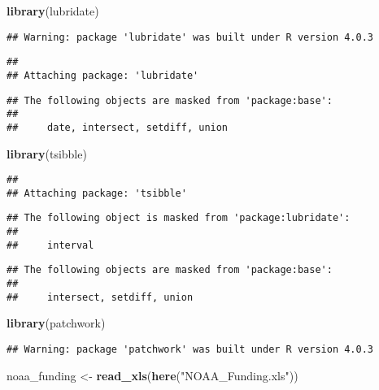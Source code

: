 \documentclass[
]{article}
\newenvironment{Shaded}{\begin{snugshade}}{\end{snugshade}}
\newcommand{\KeywordTok}[1]{\textcolor[rgb]{0.13,0.29,0.53}{\textbf{#1}}}
\newcommand{\NormalTok}[1]{#1}
\newcommand{\StringTok}[1]{\textcolor[rgb]{0.31,0.60,0.02}{#1}}
\begin{document}
\begin{Shaded}
\begin{Highlighting}[]
\KeywordTok{library}\NormalTok{(lubridate)}
\end{Highlighting}
\end{Shaded}

\begin{verbatim}
## Warning: package 'lubridate' was built under R version 4.0.3
\end{verbatim}

\begin{verbatim}
## 
## Attaching package: 'lubridate'
\end{verbatim}

\begin{verbatim}
## The following objects are masked from 'package:base':
## 
##     date, intersect, setdiff, union
\end{verbatim}

\begin{Shaded}
\begin{Highlighting}[]
\KeywordTok{library}\NormalTok{(tsibble)}
\end{Highlighting}
\end{Shaded}

\begin{verbatim}
## 
## Attaching package: 'tsibble'
\end{verbatim}

\begin{verbatim}
## The following object is masked from 'package:lubridate':
## 
##     interval
\end{verbatim}

\begin{verbatim}
## The following objects are masked from 'package:base':
## 
##     intersect, setdiff, union
\end{verbatim}

\begin{Shaded}
\begin{Highlighting}[]
\KeywordTok{library}\NormalTok{(patchwork)}
\end{Highlighting}
\end{Shaded}

\begin{verbatim}
## Warning: package 'patchwork' was built under R version 4.0.3
\end{verbatim}

\begin{Shaded}
\begin{Highlighting}[]
\NormalTok{noaa_funding <-}\StringTok{ }\KeywordTok{read_xls}\NormalTok{(}\KeywordTok{here}\NormalTok{(}\StringTok{"NOAA_Funding.xls"}\NormalTok{))}
\end{Highlighting}
\end{Shaded}
\end{document}
